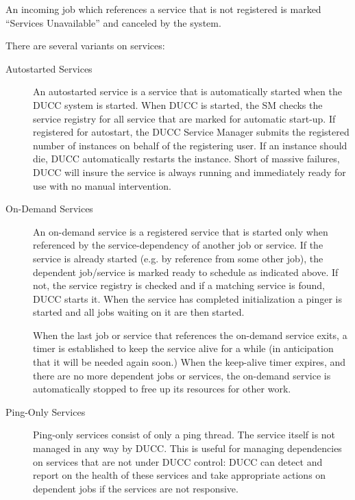       An incoming job which references a service that is not registered is marked ``Services
      Unavailable'' and canceled by the system.

      There are several variants on services:
      \begin{description}

        \item[Autostarted Services] An autostarted service is a  service that is
          automatically started when the DUCC system is started. When DUCC is started, the SM checks the
          service registry for all service that are marked for automatic start-up.  If registered for autostart,
          the DUCC Service Manager submits the registered number of instances
          on behalf of the registering user.  If an instance should die, DUCC automatically restarts
          the instance.  Short of massive failures, DUCC will insure the service is always running
          and immediately ready for use with no manual intervention.
          
        \item[On-Demand Services] An on-demand service is a registered service that is started only
          when referenced by the service-dependency of another job or service. If the service is
          already started (e.g. by reference from some other job), the dependent job/service is
          marked ready to schedule as indicated above. If not, the service registry is checked and
          if a matching service is found, DUCC starts it. When the service has completed
          initialization a pinger is started and all jobs waiting on it are then started.
          
          When the last job or service that references the on-demand service exits, a timer is
          established to keep the service alive for a while (in anticipation that it will be needed
          again soon.)  When the keep-alive timer expires, and there are no more dependent
          jobs or services, the on-demand service is automatically stopped to free up its resources for
          other work.

        \item[Ping-Only Services] 
          \label{subsub:services.ping-only}
          Ping-only services consist of only
          a ping thread.  The service itself is not managed in any way by DUCC.  This is useful for
          managing dependencies on services that are not under DUCC control: DUCC can detect and
          report on the health of these services and take appropriate actions on dependent jobs if
          the services are not responsive.
      \end{description}
          
